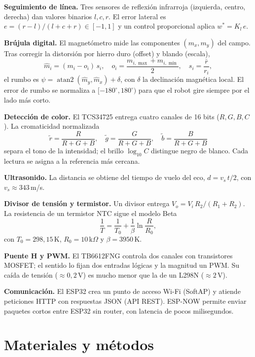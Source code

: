 \documentclass[10pt,a4paper,twocolumn]{article}
\begin{document}
\textbf{Seguimiento de línea.} Tres sensores de reflexión infrarroja (izquierda, centro, derecha) dan valores binarios $l,c,r$. El error lateral es $e=(r-l)/(l+c+r)\in[-1,1]$ y un control proporcional aplica $w^\ast=K_l\,e$.

\textbf{Brújula digital.} El magnetómetro mide las componentes $(m_x,m_y)$ del campo. Tras corregir la distorsión por hierro duro (offset) y blando (escala),
\begin{equation}
\hat m_i=(m_i-o_i)\,s_i,\quad o_i=\frac{m_{i,\max}+m_{i,\min}}{2},\quad s_i=\frac{\bar r}{r_i},
\end{equation}
el rumbo es $\psi=\operatorname{atan2}(\hat m_y,\hat m_x)+\delta$, con $\delta$ la declinación magnética local. El error de rumbo se normaliza a $[-180^\circ,180^\circ)$ para que el robot gire siempre por el lado más corto.

\textbf{Detección de color.} El TCS34725 entrega cuatro canales de 16 bits ($R,G,B,C$). La cromaticidad normalizada
\begin{equation}
\tilde r=\frac{R}{R+G+B},\quad \tilde g=\frac{G}{R+G+B},\quad \tilde b=\frac{B}{R+G+B}
\end{equation}
separa el tono de la intensidad; el brillo $\log_{10}C$ distingue negro de blanco. Cada lectura se asigna a la referencia más cercana.

\textbf{Ultrasonido.} La distancia se obtiene del tiempo de vuelo del eco, $d=v_s\,t/2$, con $v_s\approx343$\,m/s.

\textbf{Divisor de tensión y termistor.} Un divisor entrega $V_o=V_i\,R_2/(R_1+R_2)$. La resistencia de un termistor NTC sigue el modelo Beta
\begin{equation}
\frac{1}{T}=\frac{1}{T_0}+\frac{1}{\beta}\ln\frac{R}{R_0},
\end{equation}
con $T_0=298{,}15$\,K, $R_0=10$\,k$\Omega$ y $\beta=3950$\,K.

\textbf{Puente H y PWM.} El TB6612FNG controla dos canales con transistores MOSFET; el sentido lo fijan dos entradas lógicas y la magnitud un PWM. Su caída de tensión ($\approx0{,}2$\,V) es mucho menor que la de un L298N ($\approx2$\,V).

\textbf{Comunicación.} El ESP32 crea un punto de acceso Wi-Fi (SoftAP) y atiende peticiones HTTP con respuestas JSON (API REST). ESP-NOW permite enviar paquetes cortos entre ESP32 sin router, con latencia de pocos milisegundos.

\section{Materiales y métodos}
\end{document}
